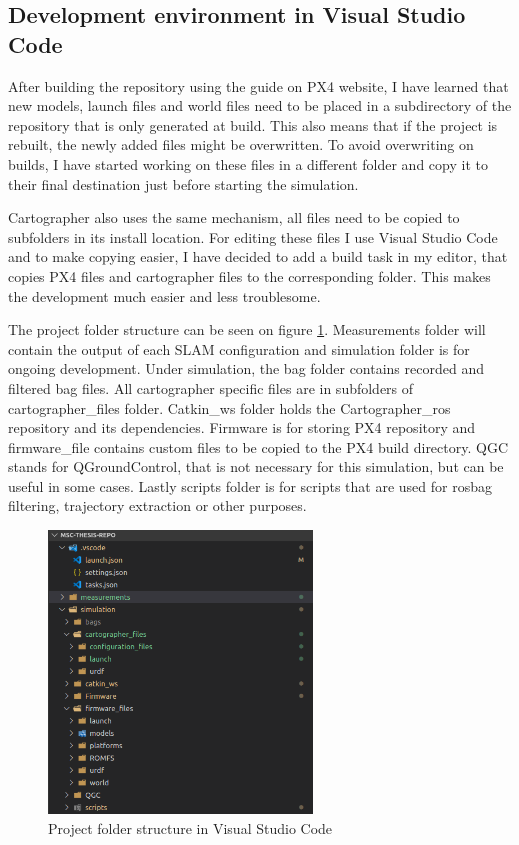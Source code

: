 \subsection{Development environment in Visual Studio Code}
After building the repository using the guide on PX4 website, I have learned that new models, launch files
and world files need to be placed in a subdirectory of the repository that is only generated at build. This
also means that if the project is rebuilt, the newly added files might be overwritten. To avoid overwriting
on builds, I have started working on these files in a different folder and copy it to their final destination
just before starting the simulation. 

Cartographer also uses the same mechanism, all files need to be copied to subfolders in its install 
location. For editing these files I use Visual Studio Code and to make copying easier, I have decided 
to add a build task in my editor, that copies PX4 files and cartographer files to the corresponding folder.
This makes the development much easier and less troublesome.

The project folder structure can be seen on figure \ref{fig:vscode_folder_structure}. Measurements folder 
will contain the output of each SLAM configuration and simulation folder is for ongoing development. Under
simulation, the bag folder contains recorded and filtered bag files. All cartographer specific files are in
subfolders of cartographer\_files folder. 
Catkin\_ws folder holds the Cartographer\_ros repository and its 
dependencies. Firmware is for storing PX4 repository and firmware\_file contains custom files to be copied
to the PX4 build directory. QGC stands for QGroundControl, that is not necessary for this simulation, but
can be useful in some cases. Lastly scripts folder is for scripts that are used for rosbag filtering, 
trajectory extraction or other purposes.


\begin{figure}[!ht]
    \centering
    \includegraphics[width=70mm, keepaspectratio]{figures/vscode_folder_structure.png}
    \caption{Project folder structure in Visual Studio Code}
    \label{fig:vscode_folder_structure}
\end{figure}



